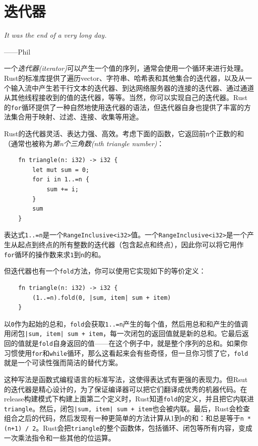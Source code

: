 \chapter{迭代器}\label{ch15}

\emph{It was the end of a very long day.}

\begin{flushright}
    ——Phil
\end{flushright}

一个\emph{迭代器(iterator)}可以产生一个值的序列，通常会使用一个循环来进行处理。Rust的标准库提供了遍历vector、字符串、哈希表和其他集合的迭代器，以及从一个输入流中产生若干行文本的迭代器、到达网络服务器的连接的迭代器、通过通道从其他线程接收到的值的迭代器，等等。当然，你可以实现自己的迭代器。Rust的\texttt{for}循环提供了一种自然地使用迭代器的语法，但迭代器自身也提供了丰富的方法集合用于映射、过滤、连接、收集等用途。

Rust的迭代器灵活、表达力强、高效。考虑下面的函数，它返回前\texttt{n}个正数的和（通常也被称为\emph{第n个三角数(nth triangle number)}：
\begin{verbatim}
    fn triangle(n: i32) -> i32 {
        let mut sum = 0;
        for i in 1..=n {
            sum += i;
        }
        sum
    }
\end{verbatim}

表达式\texttt{1..=n}是一个\texttt{RangeInclusive<i32>}值。一个\texttt{RangeInclusive<i32>}是一个产生从起点到终点的所有整数的迭代器（包含起点和终点），因此你可以将它用作\texttt{for}循环的操作数来求\texttt{1}到\texttt{n}的和。

但迭代器也有一个\texttt{fold}方法，你可以使用它实现如下的等价定义：
\begin{verbatim}
    fn triangle(n: i32) -> i32 {
        (1..=n).fold(0, |sum, item| sum + item)
    }
\end{verbatim}

以\texttt{0}作为起始的总和，\texttt{fold}会获取\texttt{1..=n}产生的每个值，然后用总和和产生的值调用闭包\texttt{|sum, item| sum + item}，每一次闭包的返回值就是新的总和。它最后返回的值就是\texttt{fold}自身返回的值——在这个例子中，就是整个序列的总和。如果你习惯使用\texttt{for}和\texttt{while}循环，那么这看起来会有些奇怪，但一旦你习惯了它，\texttt{fold}就是一个可读性强而简洁的替代方案。

这种写法是函数式编程语言的标准写法，这使得表达式有更强的表现力。但Rsut的迭代器是精心设计的，为了保证编译器可以把它们翻译成优秀的机器代码。在release构建模式下构建上面第二个定义时，Rust知道\texttt{fold}的定义，并且把它内联进\texttt{triangle}。然后，闭包\texttt{|sum, item| sum + item}也会被内联。最后，Rust会检查组合之后的代码，然后发现有一种更简单的方法计算从1到\texttt{n}的和：和总是等于\texttt{n * (n+1) / 2}。Rust会把\texttt{triangle}的整个函数体，包括循环、闭包等所有内容，变成一次乘法指令和一些其他的位运算。

